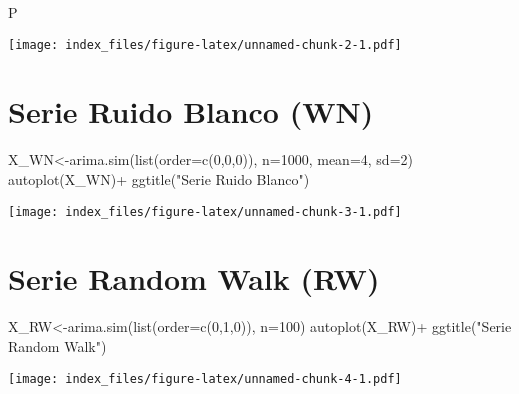 \documentclass[
]{book}
\newenvironment{Shaded}{\begin{snugshade}}{\end{snugshade}}
\newcommand{\AttributeTok}[1]{\textcolor[rgb]{0.77,0.63,0.00}{#1}}
\newcommand{\DecValTok}[1]{\textcolor[rgb]{0.00,0.00,0.81}{#1}}
\newcommand{\FunctionTok}[1]{\textcolor[rgb]{0.00,0.00,0.00}{#1}}
\newcommand{\NormalTok}[1]{#1}
\newcommand{\OtherTok}[1]{\textcolor[rgb]{0.56,0.35,0.01}{#1}}
\newcommand{\SpecialCharTok}[1]{\textcolor[rgb]{0.00,0.00,0.00}{#1}}
\newcommand{\StringTok}[1]{\textcolor[rgb]{0.31,0.60,0.02}{#1}}
\begin{document}
\begin{Shaded}
\begin{Highlighting}[]
\NormalTok{P}
\end{Highlighting}
\end{Shaded}

\texttt{[image: index\_files/figure-latex/unnamed-chunk-2-1.pdf]}

\hypertarget{serie-ruido-blanco-wn}{%
\section{Serie Ruido Blanco (WN)}\label{serie-ruido-blanco-wn}}

\begin{Shaded}
\begin{Highlighting}[]
\NormalTok{X\_WN}\OtherTok{\textless{}{-}}\FunctionTok{arima.sim}\NormalTok{(}\FunctionTok{list}\NormalTok{(}\AttributeTok{order=}\FunctionTok{c}\NormalTok{(}\DecValTok{0}\NormalTok{,}\DecValTok{0}\NormalTok{,}\DecValTok{0}\NormalTok{)), }\AttributeTok{n=}\DecValTok{1000}\NormalTok{, }\AttributeTok{mean=}\DecValTok{4}\NormalTok{, }\AttributeTok{sd=}\DecValTok{2}\NormalTok{)}
\FunctionTok{autoplot}\NormalTok{(X\_WN)}\SpecialCharTok{+}
\FunctionTok{ggtitle}\NormalTok{(}\StringTok{"Serie Ruido Blanco"}\NormalTok{)}
\end{Highlighting}
\end{Shaded}

\texttt{[image: index\_files/figure-latex/unnamed-chunk-3-1.pdf]}

\hypertarget{serie-random-walk-rw}{%
\section{Serie Random Walk (RW)}\label{serie-random-walk-rw}}

\begin{Shaded}
\begin{Highlighting}[]
\NormalTok{X\_RW}\OtherTok{\textless{}{-}}\FunctionTok{arima.sim}\NormalTok{(}\FunctionTok{list}\NormalTok{(}\AttributeTok{order=}\FunctionTok{c}\NormalTok{(}\DecValTok{0}\NormalTok{,}\DecValTok{1}\NormalTok{,}\DecValTok{0}\NormalTok{)), }\AttributeTok{n=}\DecValTok{100}\NormalTok{)}
\FunctionTok{autoplot}\NormalTok{(X\_RW)}\SpecialCharTok{+}
\FunctionTok{ggtitle}\NormalTok{(}\StringTok{"Serie Random Walk"}\NormalTok{)}
\end{Highlighting}
\end{Shaded}

\texttt{[image: index\_files/figure-latex/unnamed-chunk-4-1.pdf]}
\end{document}
